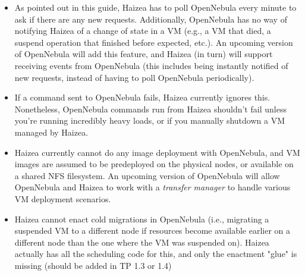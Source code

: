 \begin{itemize}
\item As pointed out in this guide, Haizea has to poll OpenNebula every minute to ask if there are any new requests. Additionally, OpenNebula has no way of notifying Haizea of a change of state in a VM (e.g., a VM that died, a suspend operation that finished before expected, etc.). An upcoming version of OpenNebula will add this feature, and Haizea (in turn) will support receiving events from OpenNebula (this includes being instantly notified of new requests, instead of having to poll OpenNebula periodically).
\item If a command sent to OpenNebula fails, Haizea currently ignores this. Nonetheless, OpenNebula commands run from Haizea shouldn't fail unless you're running incredibly heavy loads, or if you manually shutdown a VM managed by Haizea.
\item Haizea currently cannot do any image deployment with OpenNebula, and VM images are assumed to be predeployed on the physical nodes, or available on a shared NFS filesystem. An upcoming version of OpenNebula will allow OpenNebula and Haizea to work with a \emph{transfer manager} to handle various VM deployment scenarios.
\item Haizea cannot enact cold migrations in OpenNebula (i.e., migrating a suspended VM to a different node if resources become available earlier on a different node than the one where the VM was suspended on). Haizea actually has all the scheduling code for this, and only the enactment "glue" is missing (should be added in TP 1.3 or 1.4)
\end{itemize}